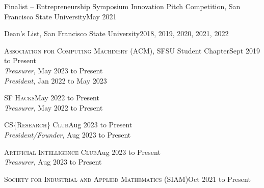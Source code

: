 \documentclass[hidelinks, 10pt]{article}
\begin{document}
{\begin{minipage}[ct]{0.9\linewidth}
\vspace{1.5mm}

Finalist -- Entrepreneurship Symposium Innovation Pitch Competition, San
Francisco State University\hfill May 2021

\vspace{1.5mm}

Dean's List, San Francisco State University\hfill 2018, 2019, 2020, 2021, 2022
\end{minipage}
    
\vspace{7mm}


\hrulefill

\vspace{4mm}

\begin{minipage}[ct]{0.9\linewidth}
\textsc{Association for Computing Machinery} (ACM), SFSU Student Chapter\hfill Sept 2019 to
Present\\
\emph{Treasurer}, May 2023 to Present\\
\emph{President}, Jan 2022 to May 2023

\vspace{1.5mm}

\textsc{SF Hacks}\hfill May 2022 to Present\\
\emph{Treasurer}, May 2022 to Present

\vspace{1.5mm}

\textsc{CS\{Research\} Club}\hfill Aug 2023 to Present\\
\emph{President/Founder}, Aug 2023 to Present

\vspace{1.5mm}

\textsc{Artificial Intelligence Club}\hfill Aug 2023 to Present\\
\emph{Treasurer}, Aug 2023 to Present

\vspace{1.5mm}

\textsc{Society for Industrial and Applied Mathematics} (SIAM)\hfill Oct 2021 to Present\\
\end{minipage}

\vspace{4mm}
\pagebreak

}
\end{document}
